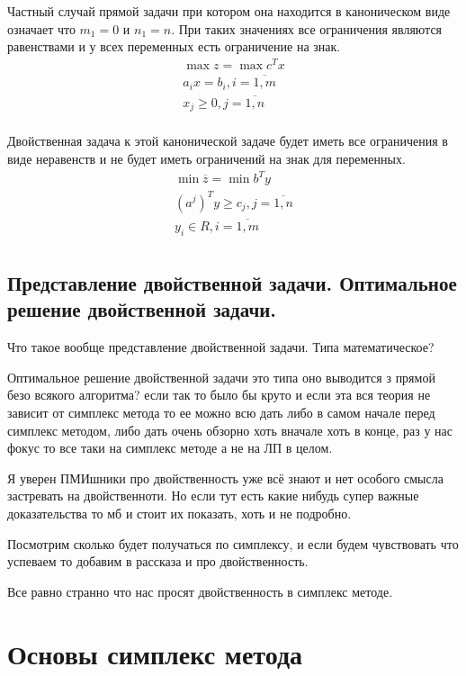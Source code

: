 \documentclass[a4paper,article,14pt]{extarticle}
\begin{document}
Частный случай прямой задачи при котором она находится в каноническом виде означает что \(m_1 = 0\) и \(n_1 = n\).
При таких значениях все ограничения являются равенствами и у всех переменных есть ограничение на знак.
\begin{gather}
    \max z = \max c^T x \\
    a_ix = b_i, i = \overline{1, m} \\
    x_j \ge 0, j = \overline{1, n} \\
\end{gather}

Двойственная задача к этой канонической задаче будет иметь все ограничения в виде неравенств и не будет иметь ограничений на знак для переменных.
\begin{gather}
    \min \overline z = \min b^T y \\
    (a^j)^Ty \ge c_j, j = \overline{1, n} \\
    y_i \in R, i = \overline{1, m} \\
\end{gather}

\subsection{Представление двойственной задачи. Оптимальное решение двойственной задачи.}

Что такое вообще представление двойственной задачи.
Типа математическое?

Оптимальное решение двойственной задачи это типа оно выводится з прямой безо всякого алгоритма?
если так то было бы круто и если эта вся теория не зависит от симплекс метода то ее можно всю дать либо в самом начале перед симплекс методом, либо дать очень обзорно хоть вначале хоть в конце, раз у нас фокус то все таки на симплекс методе а не на ЛП в целом.

Я уверен ПМИшники про двойственность уже всё знают и нет особого смысла застревать на двойственноти.
Но если тут есть какие нибудь супер важные доказательства то мб и стоит их показать, хоть и не подробно.

Посмотрим сколько будет получаться по симплексу, и если будем чувствовать что успеваем то добавим в рассказа и про двойственность.

Все равно странно что нас просят двойственность в симплекс методе.

\section{Основы симплекс метода}
\end{document}
